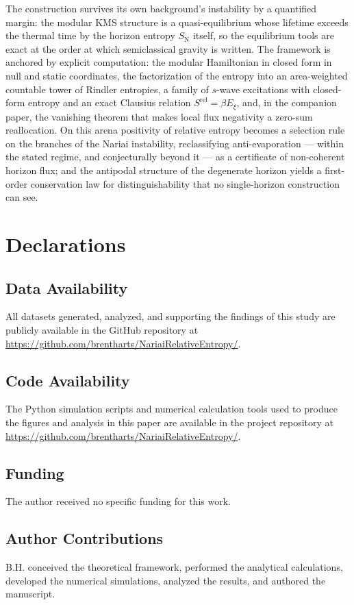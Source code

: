 \documentclass[11pt]{article}
\newcommand{\Srel}{S^{\mathrm{rel}}}
\newcommand{\Nariai}{Nariai}
\begin{document}
The construction survives its own background's instability by a quantified margin: the modular KMS structure is a quasi-equilibrium whose lifetime exceeds the thermal time by the horizon entropy $S_{\mathrm{N}}$ itself, so the equilibrium tools are exact at the order at which semiclassical gravity is written. The framework is anchored by explicit computation: the modular Hamiltonian in closed form in null and static coordinates, the factorization of the entropy into an area-weighted countable tower of Rindler entropies, a family of $s$-wave excitations with closed-form entropy and an exact Clausius relation $\Srel = \beta E_\xi$, and, in the companion paper, the vanishing theorem that makes local flux negativity a zero-sum reallocation. On this arena positivity of relative entropy becomes a selection rule on the branches of the \Nariai{} instability, reclassifying anti-evaporation --- within the stated regime, and conjecturally beyond it --- as a certificate of non-coherent horizon flux; and the antipodal structure of the degenerate horizon yields a first-order conservation law for distinguishability that no single-horizon construction can see.


\section*{Declarations}

\subsection*{Data Availability}
All datasets generated, analyzed, and supporting the findings of this study are publicly available in the GitHub repository at \url{https://github.com/brentharts/NariaiRelativeEntropy/}.

\subsection*{Code Availability}
The Python simulation scripts and numerical calculation tools used to produce the figures and analysis in this paper are available in the project repository at \url{https://github.com/brentharts/NariaiRelativeEntropy/}.

\subsection*{Funding}
The author received no specific funding for this work.

\subsection*{Author Contributions}
B.H. conceived the theoretical framework, performed the analytical calculations, developed the numerical simulations, analyzed the results, and authored the manuscript.
\end{document}
